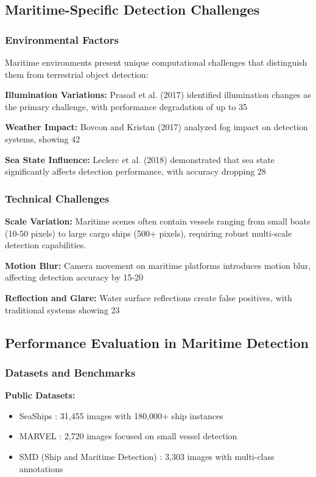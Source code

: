 \documentclass[a4paper,11pt]{article}
\begin{document}
\subsection{Maritime-Specific Detection Challenges}

\subsubsection{Environmental Factors}
Maritime environments present unique computational challenges that distinguish them from terrestrial object detection:

\textbf{Illumination Variations:} Prasad et al. (2017) \cite{prasad2017video} identified illumination changes as the primary challenge, with performance degradation of up to 35%

\textbf{Weather Impact:} Bovcon and Kristan (2017) \cite{bovcon2017segmentation} analyzed fog impact on detection systems, showing 42%

\textbf{Sea State Influence:} Leclerc et al. (2018) \cite{leclerc2018impact} demonstrated that sea state significantly affects detection performance, with accuracy dropping 28%

\subsubsection{Technical Challenges}

\textbf{Scale Variation:} Maritime scenes often contain vessels ranging from small boats (10-50 pixels) to large cargo ships (500+ pixels), requiring robust multi-scale detection capabilities.

\textbf{Motion Blur:} Camera movement on maritime platforms introduces motion blur, affecting detection accuracy by 15-20%

\textbf{Reflection and Glare:} Water surface reflections create false positives, with traditional systems showing 23%

\subsection{Performance Evaluation in Maritime Detection}

\subsubsection{Datasets and Benchmarks}
\textbf{Public Datasets:}
\begin{itemize}
    \item SeaShips \cite{shao2018seaships}: 31,455 images with 180,000+ ship instances
    \item MARVEL \cite{bloisi2017maritime}: 2,720 images focused on small vessel detection
    \item SMD (Ship and Maritime Detection) \cite{wang2021ship}: 3,303 images with multi-class annotations
\end{itemize}
\end{document}
